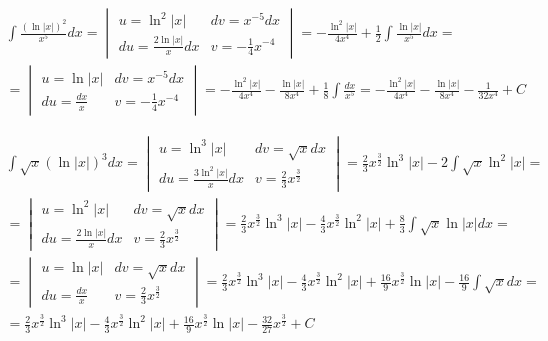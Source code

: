 
\begin{gather*}
  \int \frac{(\ln|x|)^2}{x^5}dx =
  \begin{vmatrix}
    u=\ln^2|x| & dv=x^{-5}dx \\
    du=\frac{2\ln|x|}{x}dx & v=-\frac{1}{4}x^{-4}
  \end{vmatrix}
  = -\frac{\ln^2|x|}{4x^4} + \frac{1}{2} \int \frac{\ln|x|}{x^5}dx = \\
  = \begin{vmatrix}
    u=\ln|x| & dv=x^{-5}dx \\
    du=\frac{dx}{x} & v=-\frac{1}{4}x^{-4}
  \end{vmatrix}
  = -\frac{\ln^2|x|}{4x^4} - \frac{\ln|x|}{8x^4} + \frac{1}{8} \int \frac{dx}{x^5}
  = -\frac{\ln^2|x|}{4x^4} - \frac{\ln|x|}{8x^4} - \frac{1}{32x^4} + C
\end{gather*}



\begin{gather*}
  \int \sqrt{x} (\ln|x|)^3 dx =
  \begin{vmatrix}
    u=\ln^3|x| & dv=\sqrt{x}dx \\
    du=\frac{3\ln^2|x|}{x}dx & v=\frac{2}{3}x^{\frac{3}{2}}
  \end{vmatrix}
  = \frac{2}{3}x^{\frac{3}{2}}\ln^3|x| - 2 \int \sqrt{x}\ln^2|x| = \\
  = \begin{vmatrix}
    u=\ln^2|x| & dv=\sqrt{x}dx \\
    du=\frac{2\ln|x|}{x}dx & v=\frac{2}{3}x^{\frac{3}{2}}
  \end{vmatrix}
  = \frac{2}{3}x^{\frac{3}{2}}\ln^3|x| - \frac{4}{3}x^{\frac{3}{2}}\ln^2|x| + \frac{8}{3}\int \sqrt{x}\ln|x|dx = \\
  = \begin{vmatrix}
    u=\ln|x| & dv=\sqrt{x}dx \\
    du=\frac{dx}{x} & v=\frac{2}{3}x^{\frac{3}{2}}
  \end{vmatrix}
  = \frac{2}{3}x^{\frac{3}{2}}\ln^3|x| - \frac{4}{3}x^{\frac{3}{2}}\ln^2|x| + \frac{16}{9}x^{\frac{3}{2}}\ln|x| - \frac{16}{9} \int \sqrt{x}dx = \\
  = \frac{2}{3}x^{\frac{3}{2}}\ln^3|x| - \frac{4}{3}x^{\frac{3}{2}}\ln^2|x| + \frac{16}{9}x^{\frac{3}{2}}\ln|x| - \frac{32}{27}x^{\frac{3}{2}}+C
\end{gather*}




